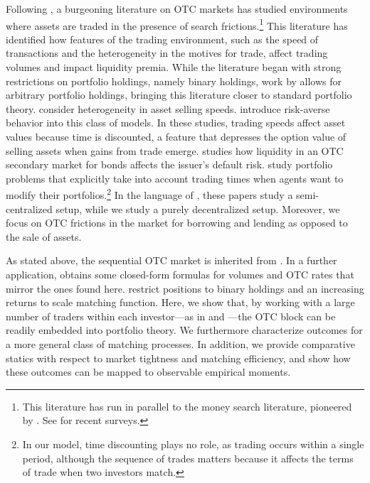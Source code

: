 \documentclass[12pt,american,english,notitlepage]{article}
\begin{document}
Following \citet*{Duffie2005}, a burgeoning literature on OTC markets
has studied environments where assets are traded in the presence of search
frictions.\footnote{This literature has run in parallel to the money search literature,
pioneered by \cite{kiyotaki1993search}. See \citet{williamson_wright_2010_models,Lagos2017}
for recent surveys.} This literature has identified how features of the trading environment, such as the speed of transactions and the heterogeneity in the motives for trade, affect trading volumes and impact liquidity premia. While
the literature began with strong restrictions on portfolio holdings,
namely binary holdings, work by \citet{Lagos2009} allows for arbitrary
portfolio holdings, bringing this literature closer to standard portfolio
theory. \citet{HuggonierLesterWeill22} consider heterogeneity in
asset selling speeds. \citet{Uslu2019} introduce risk-averse
behavior into this class of models. In these studies, trading speeds
affect asset values because time is discounted, a feature that depresses
the option value of selling assets when gains from trade emerge. \citet{he2014endogenous} studies how liquidity in an OTC secondary market for bonds affects the issuer's default risk. \citet{SilvaPassadoreKargar}
study portfolio problems that explicitly
take into account trading times when agents want to modify their portfolios.\footnote{In our model, time discounting plays no role, as trading occurs within
a single period, although the sequence of trades matters because it
affects the terms of trade when two investors match.} In the language of \cite{Hugonnier-book}, these papers study a semi-centralized
setup, while we study a purely decentralized setup. 
Moreover, we focus on OTC frictions in the market for borrowing and lending as opposed to the sale of assets.

As stated above, the sequential OTC market is inherited from \citet*{AL15-ECMA}. In a further application, \citet{Afonso2015-jmcb} obtains some closed-form formulas for volumes and OTC rates that mirror the ones found here. \citet{Afonso2015-jmcb} restrict positions to binary holdings and an increasing returns to scale matching function. Here, we show that, by working with a large number of traders within each investor---as in \citet{Shi1997} and \citet*{AEW15}---the OTC block can be readily embedded into portfolio theory. We furthermore characterize outcomes for a more general class of matching processes.
In addition, we provide comparative statics with respect to market tightness and matching efficiency, and show how these outcomes can be mapped to observable empirical moments.
\end{document}
